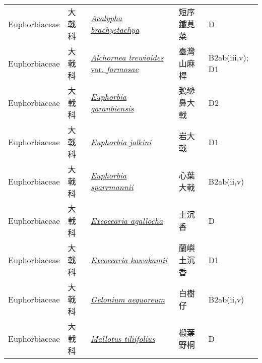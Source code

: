 {\begin{longtable}{L{2.5cm}L{2cm}L{5cm}L{2.5cm}L{3cm}}
    Euphorbiaceae & 大戟科 & \href{http://www.theplantlist.org/tpl1.1/search?q=Acalypha+brachystachya}{\textit{Acalypha brachystachya} } & 短序鐵莧菜 & D    \\
    Euphorbiaceae & 大戟科 & \href{http://www.theplantlist.org/tpl1.1/search?q=Alchornea+trewioides+var.+formosae}{\textit{Alchornea trewioides} var. \textit{formosae} } & 臺灣山麻桿 & B2ab(iii,v); D1    \\
    Euphorbiaceae & 大戟科 & \href{http://www.theplantlist.org/tpl1.1/search?q=Euphorbia+garanbiensis}{\textit{Euphorbia garanbiensis} } & 鵝鑾鼻大戟 & D2    \\
    Euphorbiaceae & 大戟科 & \href{http://www.theplantlist.org/tpl1.1/search?q=Euphorbia+jolkini}{\textit{Euphorbia jolkini} } & 岩大戟 & D1    \\
    Euphorbiaceae & 大戟科 & \href{http://www.theplantlist.org/tpl1.1/search?q=Euphorbia+sparrmannii}{\textit{Euphorbia sparrmannii} } & 心葉大戟 & B2ab(ii,v)    \\
    Euphorbiaceae & 大戟科 & \href{http://www.theplantlist.org/tpl1.1/search?q=Excoecaria+agallocha}{\textit{Excoecaria agallocha} } & 土沉香 & D    \\
    Euphorbiaceae & 大戟科 & \href{http://www.theplantlist.org/tpl1.1/search?q=Excoecaria+kawakamii}{\textit{Excoecaria kawakamii} } & 蘭嶼土沉香 & D1    \\
    Euphorbiaceae & 大戟科 & \href{http://www.theplantlist.org/tpl1.1/search?q=Gelonium+aequoreum}{\textit{Gelonium aequoreum} } & 白樹仔 & B2ab(ii,v)    \\
    Euphorbiaceae & 大戟科 & \href{http://www.theplantlist.org/tpl1.1/search?q=Mallotus+tiliifolius}{\textit{Mallotus tiliifolius} } & 椴葉野桐 & D　    \\

\end{longtable}}
